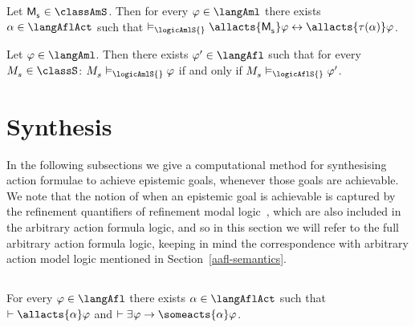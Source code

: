 \begin{corollary}
Let $\aPModel{\aStateS} \in \classAmS$.
Then for every $\phi \in \langAml$ there exists $\alpha \in \langAflAct$ such that $\entails_\logicAmlS{} \allacts{\aPModel{\aStateS}} \phi \iff \allacts{\tau(\alpha)} \phi$.
\end{corollary}

\begin{corollary}
Let $\phi \in \langAml$. 
Then there exists $\phi' \in \langAfl$ such that for every $\kPModel{\kStateS} \in \classS$: $\kPModel{\kStateS} \entails_\logicAmlS{} \phi$ if and only if $\kPModel{\kStateS} \entails_\logicAflS{} \phi'$.
\end{corollary}

\section{Synthesis}\label{synthesis}

In the following subsections we give a computational method for synthesising action formulae to achieve epistemic goals, whenever those goals are achievable.
We note that the notion of when an epistemic goal is achievable is captured by the refinement quantifiers of refinement modal logic~\cite{vanditmarsch:2009,bozzelli:2014b}, which are also included in the arbitrary action formula logic, and so in this section we will refer to the full arbitrary action formula logic, keeping in mind the correspondence with arbitrary action model logic mentioned in Section~\ref{aafl-semantics}.

\subsection{\classK{}}

\begin{proposition}\label{afl-k-synthesis}
For every $\phi \in \langAfl$ there exists $\alpha \in \langAflAct$ such that $\proves \allacts{\alpha} \phi$ and $\proves \somerefs \phi \implies \someacts{\alpha} \phi$.
\end{proposition}

